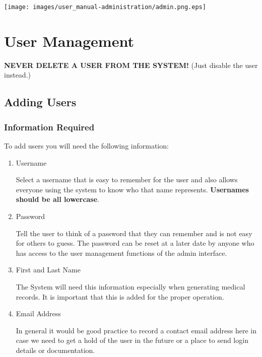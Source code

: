 \texttt{[image: images/user\_manual-administration/admin.png.eps]}

\section{User Management}

\textbf{NEVER DELETE A USER FROM THE SYSTEM!} (Just disable the user instead.)

\subsection{Adding Users}
\subsubsection{Information Required}

  To add users you will need the following information:

\begin{enumerate}

\item Username

Select a username that is easy to remember for the user and also allows
everyone using the system to know who that name represents. \textbf{Usernames
should be all lowercase}.

\item Password

Tell the user to think of a password that they can remember and is not
easy for others to guess. The password can be reset at a later date by
anyone who has access to the user management functions of the admin
interface.

\item First and Last Name

The System will need this information especially when generating medical
records. It is important that this is added for the proper operation.

\item Email Address

In general it would be good practice to record a contact email address
here in case we need to get a hold of the user in the future or a place
to send login details or documentation.

\end{enumerate}

